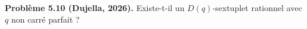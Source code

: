 \textbf{Problème 5.10 (Dujella, 2026).} Existe-t-il un $D(q)$-sextuplet rationnel avec $q$ non carré parfait ?
